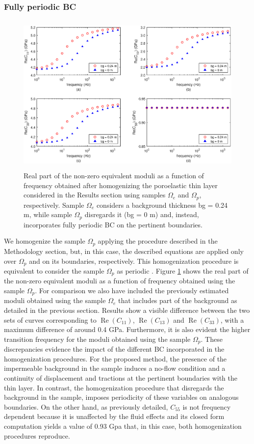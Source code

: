 \documentclass[draft]{agujournal2019}
\renewcommand{\Re}{\operatorname{Re} }
\begin{document}
\subsubsection{Fully periodic BC}
\begin{figure}[!ht]
\centering
        \includegraphics[width= 120mm, height=80mm]{Figure4.eps}
\caption{Real part of the non-zero equivalent moduli as a function of frequency obtained after homogenizing the poroelastic thin layer considered in the Results section using samples $\Omega_e$ and $\Omega_p$, respectively. Sample $\Omega_e$ considers a background thickness bg = 0.24 m, while sample $\Omega_p$ disregards it (bg = 0 m) and, instead, incorporates fully periodic BC on the pertinent boundaries. }
\label{fig.4}
\end{figure}

We homogenize the sample $\Omega_p$ applying the procedure described in the Methodology section, but, in this case, the described equations are applied only  over $\Omega_p$ and on its boundaries, respectively. 
This homogenization procedure is equivalent to consider the sample $\Omega_p$ as periodic \cite{Favino2020}. 
Figure \ref{fig.4} shows the real part of the non-zero equivalent moduli as a function of frequency obtained using the sample $\Omega_p$. For comparison we also have included the previously estimated moduli obtained using the sample $\Omega_e$  that includes part of the background as detailed in the previous section. Results show  a visible difference between the two sets of curves corresponding to $\Re(C_{11})$, $\Re(C_{13})$ and $\Re(C_{33})$, with a maximum difference of around 0.4 GPa. Furthermore, it is also evident the higher transition frequency for the moduli obtained using the sample $\Omega_p$. These discrepancies evidence the impact of the different BC incorporated in the homogenization procedures. For the proposed method, the presence of the impermeable background in the sample induces a no-flow condition and a continuity  of displacement and tractions at the pertinent boundaries with the thin layer. In contrast, the  homogenization procedure that disregards the background in the sample, imposes periodicity of these variables on analogous boundaries. 
On the other hand, as previously detailed, $C_{55}$ is not frequency dependent because it is unaffected by the fluid effects and its closed form computation yields a value of 0.93 Gpa that, in this case, both homogenization procedures reproduce.
\end{document}

